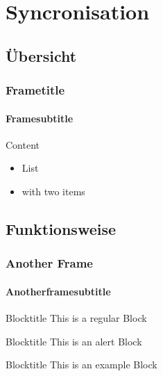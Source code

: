 \section{Syncronisation}
\subsection{Übersicht}
\begin{frame}
    \frametitle{Frametitle}
    \framesubtitle{Framesubtitle}
    Content
    \begin{itemize}
        \item List
        \item with two items
    \end{itemize}
\end{frame}

\subsection{Funktionsweise}
\begin{frame}
    \frametitle{Another Frame}
    \framesubtitle{Anotherframesubtitle}
    \begin{block}{Blocktitle}
        This is a regular Block
    \end{block}
    \begin{alertblock}{Blocktitle}
        This is an alert Block
    \end{alertblock}
    \begin{exampleblock}{Blocktitle}
        This is an example Block
    \end{exampleblock}
\end{frame}
